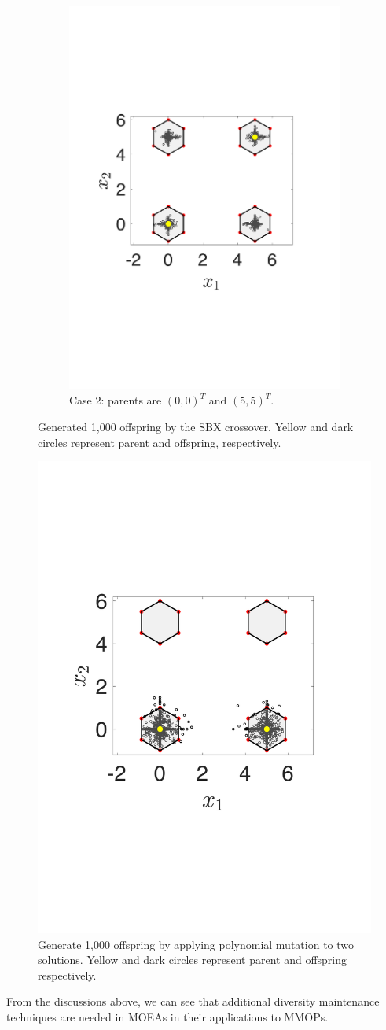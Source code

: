 \documentclass[conference]{IEEEtran}
\begin{document}
\begin{figure}[t!]
\begin{subfigure}[b]{.24\textwidth}
		\includegraphics[width=\linewidth]{Section3/crossover2}
		\caption{Case 2: parents are $(0, 0)^T$ and $(5, 5)^T$.}
		\label{fig: SBX crossover case 2}
	\end{subfigure}
	\caption{Generated 1,000 offspring by the SBX crossover. Yellow and dark circles represent parent and offspring, respectively.}
	\label{fig: SBX crossover}
\end{figure}

\begin{figure}[t!]
    \centering
    \includegraphics[width=.24\textwidth]{Section3/mutation}
    \caption{Generate 1,000 offspring by applying polynomial mutation to two solutions. Yellow and dark circles represent parent and offspring respectively.}
    \label{fig: Polynomial mutation}
\end{figure}
From the discussions above, we can see that additional diversity maintenance techniques are needed in MOEAs in their applications to MMOPs.
\end{document}
